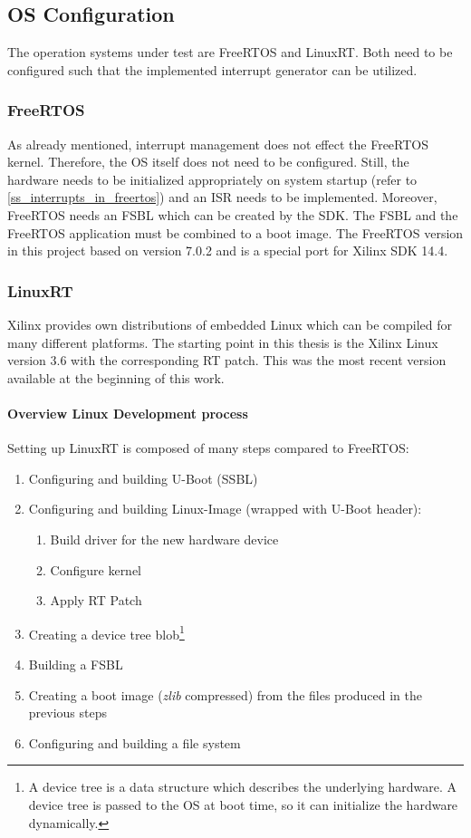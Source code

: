 \subsection{\ac{OS} Configuration}
The operation systems under test are FreeRTOS and LinuxRT.
Both need to be configured such that the implemented interrupt generator can be utilized.

\subsubsection{FreeRTOS}
As already mentioned, interrupt management does not effect the FreeRTOS kernel.
Therefore, the \ac{OS} itself does not need to be configured.
Still, the hardware needs to be initialized appropriately on system startup (refer to \ref{ss_interrupts_in_freertos}) and an \ac{ISR} needs to be implemented. 
Moreover, FreeRTOS needs an \ac{FSBL} which can be created by the \ac{SDK}.
The \ac{FSBL} and the FreeRTOS application must be combined to a boot image.
The FreeRTOS version in this project based on version 7.0.2 and is a special port for Xilinx \ac{SDK} 14.4.


\subsubsection{LinuxRT}\label{sss_linuxrt}
Xilinx provides own distributions of embedded Linux which can be compiled for many different platforms. 
The starting point in this thesis is the Xilinx Linux version 3.6 with the corresponding RT patch.
This was the most recent version available at the beginning of this work.

\paragraph{Overview Linux Development process}
Setting up LinuxRT is composed of many steps compared to FreeRTOS:
\begin{enumerate}
	\item Configuring and building U-Boot (\ac{SSBL})
	\item Configuring and building Linux-Image (wrapped with U-Boot header):
		\begin{enumerate}
			\item Build driver for the new hardware device
			\item Configure kernel
			\item Apply RT Patch
		\end{enumerate}
	\item Creating a device tree blob\footnote{A device tree is a data structure which describes the underlying hardware. A device tree is passed to the \ac{OS} at boot time, so it can initialize the hardware dynamically.\cite{device_tree}}
	\item Building a \ac{FSBL}
	\item Creating a boot image (\textit{zlib} compressed) from the files produced in the previous steps 
	\item Configuring and building a file system
\end{enumerate}

